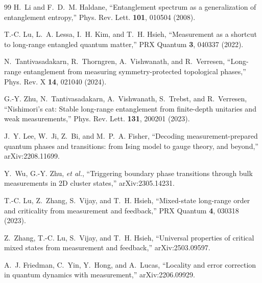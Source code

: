 \documentclass[aps,prl,onecolumn,superscriptaddress,nofootinbib]{revtex4-2}
\begin{document}
\begin{thebibliography}{99}
H.~Li and F.~D.~M. Haldane,
``Entanglement spectrum as a generalization of entanglement entropy,''
Phys. Rev. Lett. \textbf{101}, 010504 (2008).

T.-C. Lu, L.~A. Lessa, I.~H. Kim, and T.~H. Hsieh,
``Measurement as a shortcut to long-range entangled quantum matter,''
PRX Quantum \textbf{3}, 040337 (2022).

N.~Tantivasadakarn, R.~Thorngren, A.~Vishwanath, and R.~Verresen,
``Long-range entanglement from measuring symmetry-protected topological phases,''
Phys. Rev. X \textbf{14}, 021040 (2024).

G.-Y. Zhu, N.~Tantivasadakarn, A.~Vishwanath, S.~Trebst, and R.~Verresen,
``Nishimori's cat: Stable long-range entanglement from finite-depth unitaries and weak measurements,''
Phys. Rev. Lett. \textbf{131}, 200201 (2023).

J.~Y. Lee, W.~Ji, Z.~Bi, and M.~P.~A. Fisher,
``Decoding measurement-prepared quantum phases and transitions: from Ising model to gauge theory, and beyond,''
arXiv:2208.11699.

Y.~Wu, G.-Y. Zhu, \emph{et al.},
``Triggering boundary phase transitions through bulk measurements in 2D cluster states,''
arXiv:2305.14231.

T.-C. Lu, Z.~Zhang, S.~Vijay, and T.~H. Hsieh,
``Mixed-state long-range order and criticality from measurement and feedback,''
PRX Quantum \textbf{4}, 030318 (2023).

Z.~Zhang, T.-C. Lu, S.~Vijay, and T.~H. Hsieh,
``Universal properties of critical mixed states from measurement and feedback,''
arXiv:2503.09597.

A.~J. Friedman, C.~Yin, Y.~Hong, and A.~Lucas,
``Locality and error correction in quantum dynamics with measurement,''
arXiv:2206.09929.

\end{thebibliography}
\end{document}
